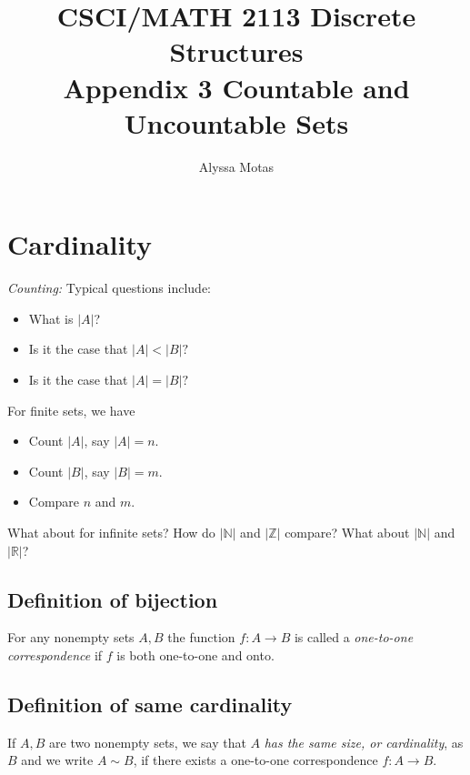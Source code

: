 \documentclass[11pt]{article}
\title{\textbf{CSCI/MATH 2113 Discrete Structures} \\ Appendix 3 Countable and Uncountable Sets}
\author{Alyssa Motas}
\begin{document}
    \maketitle

    \pagebreak

    \tableofcontents

    \pagebreak

    \section{Cardinality}

    \emph{Counting:} Typical questions include:
    \begin{itemize}
        \item What is \(|A|\)?
        \item Is it the case that \(|A| < |B|?\)
        \item Is it the case that \(|A| = |B|?\)
    \end{itemize}

    For finite sets, we have 
    \begin{itemize}
        \item Count \(|A|\), say \(|A| = n\). 
        \item Count \(|B|\), say \(|B| = m\).
        \item Compare $n$ and $m$.
    \end{itemize}

    What about for infinite sets? How do \(|\mathbb{N}|\) and \(|\mathbb{Z}|\) compare? What about \(|\mathbb{N}|\) and \(|\mathbb{R}|\)?

    \subsection{Definition of bijection}

    For any nonempty sets $A,B$ the function \(f:A \rightarrow B\) is called a \emph{one-to-one correspondence} if $f$ is both one-to-one and onto.

    \subsection{Definition of same cardinality}

    If $A,B$ are two nonempty sets, we say that $A$ \emph{has the same size, or cardinality}, as $B$ and we write $A \sim B$, if there exists a one-to-one correspondence \(f:A \rightarrow B\).
\end{document}
